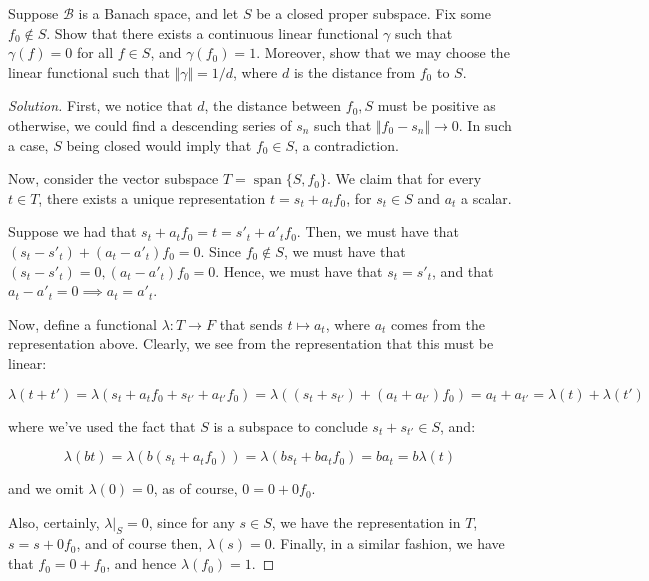 \documentclass[10pt]{article}
\newenvironment{problem}[2][]{\begin{trivlist}
\item[\hskip \labelsep {\bfseries #1}\hskip \labelsep {\bfseries #2.}]}{\end{trivlist}}
\begin{document}
\begin{problem}{Question 19}

Suppose $\mathcal{B}$ is a Banach space, and let $S$ be a closed proper subspace. Fix some $f_0 \not \in S$. Show that there exists a continuous linear functional $\gamma$ such that $\gamma(f) = 0$ for all $f \in S$, and $\gamma(f_0) = 1$. Moreover, show that we may choose the linear functional such that $\Vert \gamma \Vert = 1/d$, where $d$ is the distance from $f_0$ to $S$.

\end{problem}

\begin{proof}[Solution]

First, we notice that $d$, the distance between $f_0, S$ must be positive as otherwise, we could find a descending series of $s_n$ such that $\Vert f_0 - s_n \Vert \to 0$. In such a case, $S$ being closed would imply that $f_0 \in S$, a contradiction.

Now, consider the vector subspace $T = \operatorname{span}\{ S, f_0 \}$. We claim that for every $t \in T$, there exists a unique representation $t = s_{t} + a_{t} f_0$,  for $s_{t} \in S$ and $a_{t}$ a scalar.

Suppose we had that $s_{t} + a_{t} f_0 = t = s'_t + a'_t f_0$. Then, we must have that $(s_t - s'_t) + (a_t - a'_t) f_0 = 0$. Since $f_0 \not \in S$, we must have that $(s_t - s'_t) = 0, (a_t - a'_t) f_0 = 0$. Hence, we must have that $s_t = s'_t$, and that $a_t - a'_t = 0 \implies a_t = a'_t$.

Now, define a functional $\lambda: T \to F$ that sends $t \mapsto a_t$, where $a_t$ comes from the representation above. Clearly, we see from the representation that this must be linear:

$$ \lambda( t + t') = \lambda(s_t + a_t f_0 + s_{t'} + a_{t'} f_0) = \lambda((s_t + s_{t'}) + (a_t + a_{t'}) f_0) = a_t + a_{t'} = \lambda(t) + \lambda(t')$$

where we've used the fact that $S$ is a subspace to conclude $s_t + s_{t'} \in S$, and:

$$ \lambda(bt) = \lambda(b(s_t + a_t f_0)) =\lambda(bs_t + ba_t f_0) = b a_t = b\lambda(t)$$

and we omit $\lambda(0)  = 0 $, as of course, $ 0 = 0 + 0f_0$. 

Also, certainly, $\lambda |_{S} = 0$, since for any $s \in S$, we have the representation in $T$, $s = s + 0 f_0$, and of course then, $\lambda(s) = 0$. Finally, in a similar fashion, we have that $f_0 = 0 + f_0$, and hence $\lambda(f_0) = 1$.


\end{proof}
\end{document}
